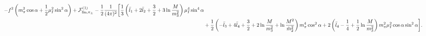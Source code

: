 \begin{align*}
    - f^2 \left(m_\pi^2 \cos \alpha + \frac{1}{2}\mu_I^2 \sin^2 \alpha\right)
    + \mathcal{F}^{(1)}_{\mathrm{fin}, \pi_\pm}
    - \frac{1}{2}\frac{1}{(4 \pi)^2}
    \bigg[
        \frac{1}{3}
        \left( 
            \bar l_1 + 2 \bar l_2 + \frac{3}{2} + 3 \ln \frac{M}{m_3^2}
        \right) \mu_I^4 \sin^4 \alpha
        \\ 
        &
        +
        \frac{1}{2}
        \left(
            - \bar l_3 + 4 \bar l_4 + \frac{3}{2} + 2\ln \frac{M}{m_3^2}
            + \ln \frac{M^2}{\tilde m^2_2}
        \right) m_\pi^4 \cos^2\alpha 
        + 2 \left(\bar l_4 - \frac{1}{4} + \frac{1}{2}\ln \frac{M}{m_3^2}\right)
        m_\pi^2 \mu_I^2 \cos\alpha \sin^2 \alpha
    \bigg].
\end{align*}